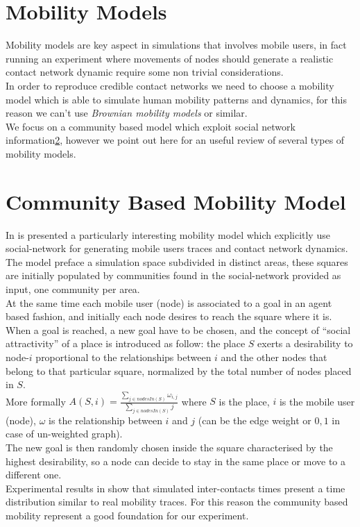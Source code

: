 \section{Mobility Models}
\label{mobility_models}

Mobility models are key aspect in simulations that involves mobile users, in fact running an experiment where movements of nodes should generate a realistic contact network dynamic require some non trivial considerations.\\
In order to reproduce credible contact networks we need to choose a mobility model which is able to simulate human mobility patterns and dynamics, for this reason we can't use \emph{Brownian mobility models} or similar.\\
We focus on a community based model which exploit social network information\ref{mobility_community_based_model}, however we point out here\cite{Camp02asurvey} for an useful review of several types of mobility models.

\section{Community Based Mobility Model}
\label{mobility_community_based_model}

In\cite{Musolesi:2006:CBM:1132983.1132990} is presented a particularly interesting mobility model which explicitly use social-network for generating mobile users traces and contact network dynamics.\\
The model preface a simulation space subdivided in distinct areas, these squares are initially populated by communities found in the social-network provided as input, one community per area.\\
At the same time each mobile user (node) is associated to a goal in an agent based fashion, and initially each node desires to reach the square where it is.\\
When a goal is reached, a new goal have to be chosen, and the concept of ``social attractivity'' of a place is introduced as follow: the place $S$ exerts a desirability to node-$i$ proportional to the relationships between $i$ and the other nodes that belong to that particular square, normalized by the total number of nodes placed in $S$.\\ More formally $ A(S,i) = \frac{ \sum_{j \in nodesIn(S)}{ \omega_{i,j}}  }{ \sum_{j \in nodesIn(S)}{j}  } $ where $S$ is the place, $i$ is the mobile user (node), $\omega$ is the relationship between $i$ and $j$ (can be the edge weight or ${0,1}$ in case of un-weighted graph).\\ The new goal is then randomly chosen inside the square characterised by the highest desirability, so a node can decide to stay in the same place or move to a different one.\\
Experimental results in \cite[3.2.2]{Musolesi:2006:CBM:1132983.1132990} show that simulated inter-contacts times present a time distribution similar to real mobility traces. For this reason the community based mobility represent a good foundation for our experiment.

